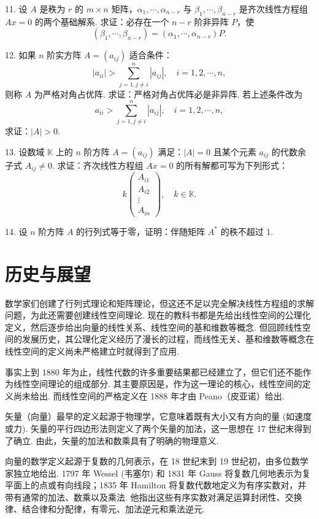 \documentclass[UTF8, 12pt, fontset=fandol, oneside]{ctexart}
\begin{document}
11. 设 $A$ 是秩为 $r$ 的 $m\times n$ 矩阵，$\alpha_1,\cdots,\alpha_{n-r}$ 与 $\beta_1,\cdots,\beta_{n-r}$ 是齐次线性方程组 $Ax=0$ 的两个基础解系. 求证：必存在一个 $n-r$ 阶非异阵 $P$，使
\[
(\beta_1,\cdots,\beta_{n-r})=(\alpha_1,\cdots,\alpha_{n-r})P.
\]

12. 如果 $n$ 阶实方阵 $A=(a_{ij})$ 适合条件：
\[
|a_{ii}|>\sum_{j=1,j\neq i}^n |a_{ij}|,\quad i=1,2,\cdots,n,
\]
则称 $A$ 为严格对角占优阵. 求证：严格对角占优阵必是非异阵. 若上述条件改为
\[
a_{ii}>\sum_{j=1,j\neq i}^n |a_{ij}|,\quad i=1,2,\cdots,n,
\]
求证：$|A|>0$.

13. 设数域 $\mathbb{K}$ 上的 $n$ 阶方阵 $A=(a_{ij})$ 满足：$|A|=0$ 且某个元素 $a_{ij}$ 的代数余子式 $A_{ij}\neq 0$. 求证：齐次线性方程组 $Ax=0$ 的所有解都可写为下列形式：
\[
k\left(\begin{array}{c}
A_{i1}\\
A_{i2}\\
\vdots\\
A_{in}
\end{array}\right),\quad k\in\mathbb{K}.
\]

14. 设 $n$ 阶方阵 $A$ 的行列式等于零，证明：伴随矩阵 $A^*$ 的秩不超过 1.

\section*{历史与展望}

数学家们创建了行列式理论和矩阵理论，但这还不足以完全解决线性方程组的求解问题，为此还需要创建线性空间理论. 现在的教科书都是先给出线性空间的公理化定义，然后逐步给出向量的线性关系、线性空间的基和维数等概念. 但回顾线性空间的发展历史，其公理化定义经历了漫长的过程，而线性无关、基和维数等概念在线性空间的定义尚未严格建立时就得到了应用.

事实上到 1880 年为止，线性代数的许多重要结果都已经建立了，但它们还不能作为线性空间理论的组成部分. 其主要原因是，作为这一理论的核心，线性空间的定义尚未给出. 而线性空间的严格定义在 1888 年才由 Peano（皮亚诺）给出.

矢量（向量）最早的定义起源于物理学，它意味着既有大小又有方向的量 (如速度或力). 矢量的平行四边形法则定义了两个矢量的加法，这一思想在 17 世纪末得到了确立. 由此，矢量的加法和数乘具有了明确的物理意义.

向量的数学定义起源于复数的几何表示，在 18 世纪末到 19 世纪初，由多位数学家独立地给出. 1797 年 Wessel (韦塞尔) 和 1831 年 Gauss 将复数几何地表示为复平面上的点或有向线段；1835 年 Hamilton 将复数代数地定义为有序实数对，并带有通常的加法、数乘以及乘法. 他指出这些有序实数对满足运算封闭性、交换律、结合律和分配律，有零元、加法逆元和乘法逆元.
\end{document}
